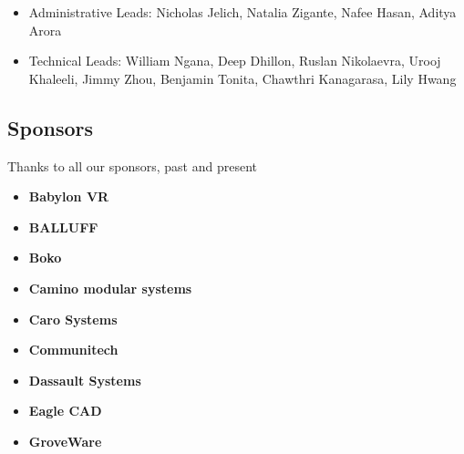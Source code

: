 \documentclass[main.tex]{subfiles}
\begin{document}
\begin{itemize}
    \item Administrative Leads: Nicholas Jelich, Natalia Zigante, Nafee Hasan, Aditya Arora
    \item Technical Leads: William Ngana, Deep Dhillon, Ruslan Nikolaevra, Urooj Khaleeli, Jimmy Zhou, Benjamin Tonita, Chawthri Kanagarasa, Lily Hwang
\end{itemize}

\subsection{Sponsors}
Thanks to all our sponsors, past and present

\begin{multicols}{3}
    \begin{itemize}[label={},noitemsep]
    \item \textbf{Babylon VR}
    \end{itemize}
    \columnbreak
    \begin{itemize}[label={},noitemsep]
    \item \textbf{BALLUFF}
    \end{itemize}
    \columnbreak
    \begin{itemize}[label={},noitemsep]
    \item \textbf{Boko}
    \end{itemize}
\end{multicols}

\begin{multicols}{3}
\begin{itemize}[label={},noitemsep]
    \item \textbf{Camino modular systems}
    \end{itemize}
    \columnbreak
    \begin{itemize}[label={},noitemsep]
    \item \textbf{Caro Systems}
    \end{itemize}
    \columnbreak
    \begin{itemize}[label={},noitemsep]
    \item \textbf{Communitech}
    \end{itemize}
    \columnbreak
\end{multicols}

\begin{multicols}{3}
\begin{itemize}[label={},noitemsep]
    \item \textbf{Dassault Systems}
    \end{itemize}
    \columnbreak
    \begin{itemize}[label={},noitemsep]
    \item \textbf{Eagle CAD}
    \end{itemize}
    \columnbreak
    \begin{itemize}[label={},noitemsep]
    \item \textbf{GroveWare}
    \end{itemize}
    \columnbreak
\end{multicols}
\end{document}
